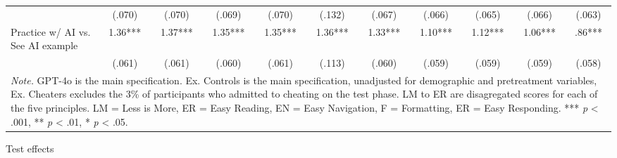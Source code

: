 \documentclass[11pt]{report}
\begin{document}
\begin{append}
\begin{landscape}
\begin{table}[h]
\begin{tabular}{lcccccccccc}
 & (.070) & (.070) & (.069) & (.070) & (.132) & (.067) & (.066) & (.065) & (.066) & (.063) \\ 
Practice w/ AI vs. See AI example & 1.36*** & 1.37*** & 1.35*** & 1.35*** & 1.36*** & 1.33*** & 1.10*** & 1.12*** & 1.06*** & .86*** \\ 
 & (.061) & (.061) & (.060) & (.061) & (.113) & (.060) & (.059) & (.059) & (.059) & (.058) \\ 
\midrule
\multicolumn{11}{p{18cm}}{\textit{Note.} GPT-4o is the main specification. Ex. Controls is the main specification, unadjusted for demographic and pretreatment variables, Ex. Cheaters excludes the 3\% of participants who admitted to cheating on the test phase. LM to ER are disagregated scores for each of the five principles. LM = Less is More, ER = Easy Reading, EN = Easy Navigation, F = Formatting, ER = Easy Responding. *** \textit{p} < .001, ** \textit{p} < .01, * \textit{p} < .05.}
\vspace{5pt}
\end{tabular}
    \label{tab:s3_practice}
\end{table}


\begin{table}[h]
    \centering
    \footnotesize
        \caption{Test effects}


\end{table}
\end{landscape}
\end{append}
\end{document}
